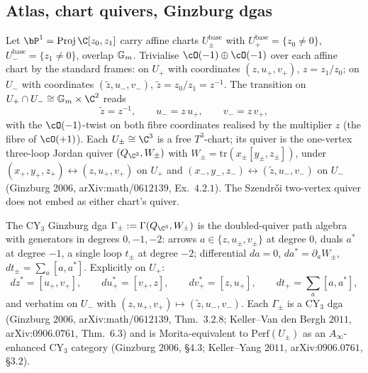 \subsection{Atlas, chart quivers, Ginzburg dgas}

Let $\bP^1 = \mathrm{Proj}\,\C[z_0, z_1]$ carry affine charts $U_\pm^{\mathrm{base}}$ with $U_+^{\mathrm{base}} = \{z_0 \neq 0\}$, $U_-^{\mathrm{base}} = \{z_1 \neq 0\}$, overlap $\mathbb{G}_m$. Trivialise $\cO(-1) \oplus \cO(-1)$ over each affine chart by the standard frames: on $U_+$ with coordinates $(z, u_+, v_+)$, $z = z_1/z_0$; on $U_-$ with coordinates $(\tilde z, u_-, v_-)$, $\tilde z = z_0/z_1 = z^{-1}$. The transition on $U_+ \cap U_- \cong \Gm \times \C^2$ reads
\begin{equation}\label{eq:conifold-transition-chart}
 \tilde z = z^{-1}, \qquad u_- = z \, u_+, \qquad v_- = z \, v_+,
\end{equation}
with the $\cO(-1)$-twist on both fibre coordinates realised by the multiplier $z$ (the fibre of $\cO(+1)$). Each $U_\pm \cong \C^3$ is a free $T^3$-chart; its quiver is the one-vertex three-loop Jordan quiver $(Q_{\C^3}, W_\pm)$ with $W_\pm = \mathrm{tr}(x_\pm [y_\pm, z_\pm])$, under $(x_+, y_+, z_+) \leftrightarrow (z, u_+, v_+)$ on $U_+$ and $(x_-, y_-, z_-) \leftrightarrow (\tilde z, u_-, v_-)$ on $U_-$ (Ginzburg 2006, arXiv:math/$0612139$, Ex.~$4.2.1$). The Szendr\H{o}i two-vertex quiver does not embed as either chart's quiver.

\begin{definition}
\label{def:conifold-chart-ginzburg}
The CY$_3$ Ginzburg dga $\Gamma_\pm := \Gamma(Q_{\C^3}, W_\pm)$ is the doubled-quiver path algebra with generators in degrees $0, -1, -2$: arrows $a \in \{z, u_\pm, v_\pm\}$ at degree $0$, duals $a^*$ at degree $-1$, a single loop $t_\pm$ at degree $-2$; differential $d a = 0$, $d a^* = \partial_a W_\pm$, $d t_\pm = \sum_a [a, a^*]$. Explicitly on $U_+$:
\[
 d z^* = [u_+, v_+], \qquad d u_+^* = [v_+, z], \qquad d v_+^* = [z, u_+], \qquad d t_+ = \textstyle\sum_a [a, a^*],
\]
and verbatim on $U_-$ with $(z, u_+, v_+) \mapsto (\tilde z, u_-, v_-)$. Each $\Gamma_\pm$ is a CY$_3$ dga (Ginzburg $2006$, arXiv:math/$0612139$, Thm.~$3.2.8$; Keller--Van den Bergh $2011$, arXiv:$0906.0761$, Thm.~$6.3$) and is Morita-equivalent to $\mathrm{Perf}(U_\pm)$ as an $A_\infty$-enhanced CY$_3$ category (Ginzburg $2006$, §$4.3$; Keller--Yang $2011$, arXiv:$0906.0761$, §$3.2$).
\end{definition}

